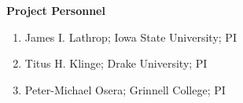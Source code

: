 \documentclass[11pt]{article}
\begin{document}
    \setcounter{page}{1}
    \begin{center}
        {\Large {\bf Project Personnel}}
    \end{center}
    \vspace*{1em}
    
    \begin{enumerate}
    \item James I. Lathrop; Iowa State University; PI
    \item Titus H. Klinge; Drake University; PI
    \item Peter-Michael Osera; Grinnell College; PI
    \end{enumerate}
\end{document}
